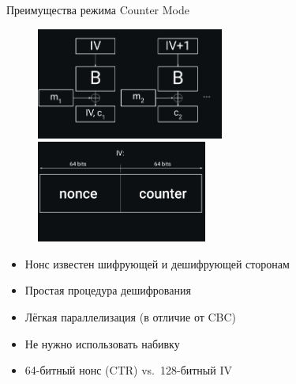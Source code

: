 \documentclass[usenames,dvipsnames,8pt,aspectratio=169]{beamer}
\begin{document}
\begin{frame}{Преимущества режима Counter Mode}
\begin{figure}
	\includegraphics[width=0.55\textwidth]{CTR}
		\includegraphics[width=0.5\textwidth]{ShapeOfIV}
\end{figure}
\vspace{-20pt}
\Large
\begin{itemize}
	\item Нонс известен шифрующей и дешифрующей сторонам
	\item Простая процедура дешифрования
	\item Лёгкая параллелизация (в отличие от CBC)
	\item Не нужно использовать набивку
	\item 64-битный нонс (CTR) vs.\ 128-битный IV
\end{itemize}

\end{frame}
\end{document}
